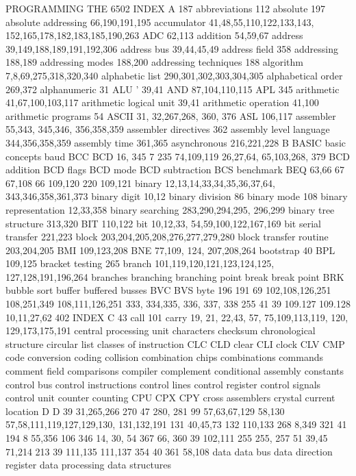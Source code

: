 \documentclass{book}
\begin{document}
{{{{{{{{{{{{{{{{{{{{{{{{{{{{{{{{{{{{{{{{{{{{{{{{{{{{{{{{{{{{{{{{{{{{{{{{{{{{{{{{{{{{{{{{{{{{{{{{{{{{{{{{{{{{{{{{{{{{{{{{{{{{{{{{{{{{{{{{{{{{PROGRAMMING THE 6502
INDEX
A 187
abbreviations 112
absolute 197
absolute addressing 66,190,191,195
accumulator 41,48,55,110,122,133,143,
152,165,178,182,183,185,190,263
ADC 62,113
addition 54,59,67
address 39,149,188,189,191,192,306
address bus 39,44,45,49
address field 358
addressing 188,189
addressing modes 188,200
addressing techniques 188
algorithm 7,8,69,275,318,320,340
alphabetic list 290,301,302,303,304,305
alphabetical order 269,372
alphanumeric 31
ALU ' 39,41
AND 87,104,110,115
APL 345
arithmetic 41,67,100,103,117
arithmetic logical unit 39,41
arithmetic operation 41,100
arithmetic programs 54
ASCII 31, 32,267,268, 360, 376
ASL 106,117
assembler 55,343, 345,346, 356,358,359
assembler directives 362
assembly level language 344,356,358,359
assembly time 361,365
asynchronous 216,221,228
B
BASIC
basic concepts
baud
BCC
BCD
16, 345
7
235
74,109,119
26,27,64, 65,103,268, 379
BCD addition
BCD flags
BCD mode
BCD subtraction
BCS
benchmark
BEQ
63,66
67
67,108
66
109,120
220
109,121
binary 12,13,14,33,34,35,36,37,64,
343,346,358,361,373
binary digit 10,12
binary division 86
binary mode 108
binary representation 12,33,358
binary searching 283,290,294,295,
296,299
binary tree structure 313,320
BIT 110,122
bit 10,12,33, 54,59,100,122,167,169
bit serial transfer 221,223
block 203,204,205,208,276,277,279,280
block transfer routine 203,204,205
BMI 109,123,208
BNE 77,109, 124, 207,208,264
bootstrap 40
BPL 109,125
bracket testing 265
branch 101,119,120,121,123,124,125,
127,128,191,196,264
branches
branching
branching point
break
break point
BRK
bubble sort
buffer
buffered
busses
BVC
BVS
byte
196
191
69
102,108,126,251
108,251,349
108,111,126,251
333, 334,335, 336, 337, 338
255
41
39
109.127
109.128
10,11,27,62
402
INDEX
C 43
call 101
carry 19, 21, 22,43, 57, 75,109,113,119,
120, 129,173,175,191
central processing unit
characters
checksum
chronological structure
circular list
classes of instruction
CLC
CLD
clear
CLI
clock
CLV
CMP
code conversion
coding
collision
combination chips
combinations
commands
comment field
comparisons
compiler
complement
conditional assembly
constants
control bus
control instructions
control lines
control register
control signals
control unit
counter
counting
CPU
CPX
CPY
cross assemblers
crystal
current location
D
D
39
31,265,266
270
47
280, 281
99
57,63,67,129
58,130
57,58,111,119,127,129,130,
131,132,191
131
40,45,73
132
110,133
268
8,349
321
41
194
8
55,356
106
346
14, 30, 54
367
66, 360
39
102,111
255
255, 257
51
39,45
71,214
213
39
111,135
111,137
354
40
361
58,108
data
data bus
data direction register
data processing
data structures
}}}}}}}}}}}}}}}}}}}}}}}}}}}}}}}}}}}}}}}}}}}}}}}}}}}}}}}}}}}}}}}}}}}}}}}}}}}}}}}}}}}}}}}}}}}}}}}}}}}}}}}}}}}}}}}}}}}}}}}}}}}}}}}}}}}}}}}}}}}}
\end{document}
